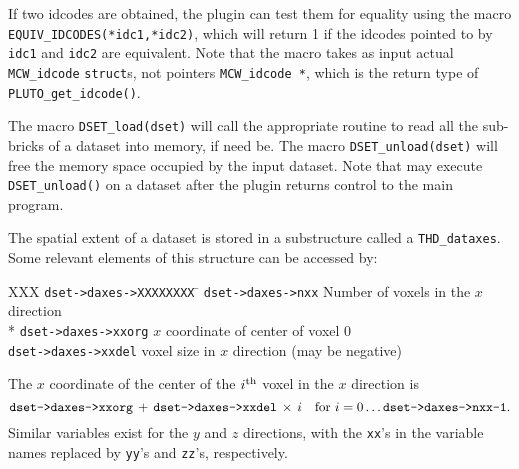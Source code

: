    If two idcodes are obtained, the plugin can test them for equality using
   the macro {\tt EQUIV\_IDCODES(*idc1,*idc2)}, which will return 1 if
   the idcodes pointed to by {\tt idc1} and {\tt idc2} are equivalent.
   Note that the macro takes as input actual {\tt MCW\_idcode} {\tt struct}s,
   not pointers {\tt MCW\_idcode *}, which is the return type of {\tt PLUTO\_get\_idcode()}.

  The macro {\tt DSET\_load(dset)} will call the appropriate routine
  to read all the sub-bricks of a dataset into memory, if need be.
  The macro {\tt DSET\_unload(dset)} will free the memory
  space occupied by the input dataset.  Note that \afnit may execute
  {\tt DSET\_unload()} on a dataset after the plugin returns control
  to the main program.

  The spatial extent of a dataset is stored in a substructure
  called a {\tt THD\_dataxes}.  Some relevant elements of this
  structure can be accessed by:
\begin{tabbing}
   XXX \= {\tt dset->daxes->XXXXXXXX} \= \kill
       \> {\tt dset->daxes->nxx}      \> Number of voxels in the $x$ direction \\*
       \> {\tt dset->daxes->xxorg}    \> $x$ coordinate of center of voxel 0\\
       \> {\tt dset->daxes->xxdel}    \> voxel size in $x$ direction (may be negative)
\end{tabbing}
  The $x$ coordinate of the center of the $i^{\rm th}$ voxel in the $x$
  direction is
  $$\hbox{\tt dset->daxes->xxorg} \,+\, \hbox{\tt dset->daxes->xxdel} \,\times\, i
    \quad {\rm for\ }i=0\ldots\hbox{\tt dset->daxes->nxx-1} .$$
  Similar variables exist for the $y$ and $z$ directions, with the
  {\tt xx}'s in the variable names replaced by {\tt yy}'s and {\tt zz}'s, respectively.


